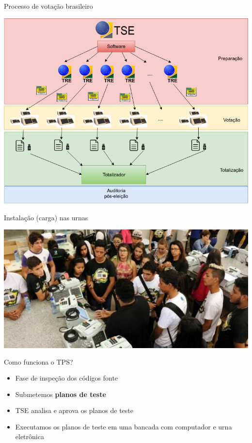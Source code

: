 \documentclass[10pt,xcolor={dvipsnames}]{beamer}
\begin{document}
\begin{frame}{Processo de votação brasileiro}
\begin{center}
\includegraphics[width=\textwidth,height=0.8\textheight,keepaspectratio]{TSE.png}
\end{center}
\end{frame}


\begin{frame}{Instalação (carga) nas urnas}
\begin{center}
\includegraphics[width=\textwidth,height=0.8\textheight,keepaspectratio]{criancas_carga.jpg}
\end{center}
\end{frame}


\begin{frame}{Como funciona o TPS?}
  \begin{itemize}
    \item Fase de inspeção dos códigos fonte
    \item Submetemos \textbf{planos de teste}
    \item TSE analisa e aprova os planos de teste
    \item Executamos os planos de teste em uma bancada com computador e urna eletrônica
  \end{itemize}
\end{frame}
\end{document}
